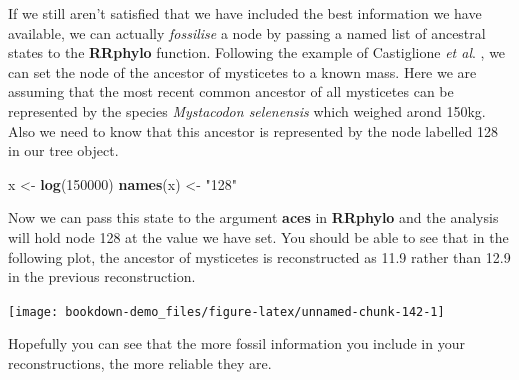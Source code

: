 \documentclass[
]{book}
\newenvironment{Shaded}{\begin{snugshade}}{\end{snugshade}}
\newcommand{\DataTypeTok}[1]{\textcolor[rgb]{0.13,0.29,0.53}{#1}}
\newcommand{\DecValTok}[1]{\textcolor[rgb]{0.00,0.00,0.81}{#1}}
\newcommand{\FloatTok}[1]{\textcolor[rgb]{0.00,0.00,0.81}{#1}}
\newcommand{\KeywordTok}[1]{\textcolor[rgb]{0.13,0.29,0.53}{\textbf{#1}}}
\newcommand{\NormalTok}[1]{#1}
\newcommand{\OperatorTok}[1]{\textcolor[rgb]{0.81,0.36,0.00}{\textbf{#1}}}
\newcommand{\OtherTok}[1]{\textcolor[rgb]{0.56,0.35,0.01}{#1}}
\newcommand{\StringTok}[1]{\textcolor[rgb]{0.31,0.60,0.02}{#1}}
\begin{document}
If we still aren't satisfied that we have included the best information we have available, we can actually \emph{fossilise} a node by passing a named list of ancestral states to the \textbf{RRphylo} function. Following the example of Castiglione \emph{et al}. \citeyearpar{Castiglione20}, we can set the node of the ancestor of mysticetes to a known mass. Here we are assuming that the most recent common ancestor of all mysticetes can be represented by the species \emph{Mystacodon selenensis} which weighed arond 150kg. Also we need to know that this ancestor is represented by the node labelled 128 in our tree object.

\begin{Shaded}
\begin{Highlighting}[]
\NormalTok{x \textless{}{-}}\StringTok{ }\KeywordTok{log}\NormalTok{(}\DecValTok{150000}\NormalTok{)}
\KeywordTok{names}\NormalTok{(x) \textless{}{-}}\StringTok{ "128"}
\end{Highlighting}
\end{Shaded}

Now we can pass this state to the argument \textbf{aces} in \textbf{RRphylo} and the analysis will hold node 128 at the value we have set. You should be able to see that in the following plot, the ancestor of mysticetes is reconstructed as 11.9 rather than 12.9 in the previous reconstruction.

\begin{Shaded}
\end{Shaded}

\begin{center}\texttt{[image: bookdown-demo\_files/figure-latex/unnamed-chunk-142-1]} \end{center}

Hopefully you can see that the more fossil information you include in your reconstructions, the more reliable they are.
\end{document}
